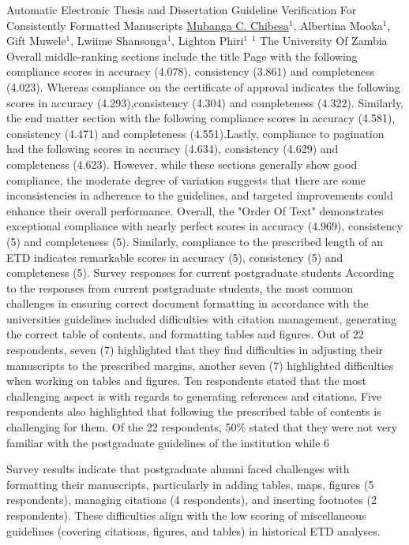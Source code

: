 \begin{abstract_online}{Automatic Electronic Thesis and Dissertation Guideline Verification For Consistently Formatted Manuscripts}{%
    \underline{Mubanga C. Chibesa}$^{1}$, Albertina Mooka$^{1}$, Gift Muwele$^{1}$, Lwiime Shansonga$^{1}$, Lighton Phiri$^{1}$}{%
    }{%
    $^1$ The University Of Zambia}
Overall middle-ranking sections include the title Page with the following compliance scores in accuracy (4.078), consistency (3.861) and completeness (4.023).  Whereas compliance on the certificate of approval indicates the following scores in accuracy (4.293),consistency (4.304) and completeness (4.322). Similarly, the end matter section with the following compliance scores in accuracy (4.581), consistency (4.471) and completeness (4.551).Lastly, compliance to pagination had the following scores in accuracy (4.634), consistency (4.629) and completeness (4.623). 
However, while these sections generally show good compliance, the moderate degree of variation suggests that there are some inconsistencies in adherence to the guidelines, and targeted improvements could enhance their overall performance.
Overall, the "Order Of Text" demonstrates exceptional compliance with nearly perfect scores in accuracy (4.969), consistency (5) and completeness (5). Similarly, compliance to the prescribed length of an ETD indicates remarkable scores in accuracy (5), consistency (5) and completeness (5).
Survey responses for current postgraduate students
According to the responses from current postgraduate students, the most common challenges in ensuring correct document formatting in accordance with the universities guidelines included difficulties with citation management, generating the correct table of contents, and formatting tables and figures. Out of 22 respondents, seven (7) highlighted that they find difficulties in adjusting their manuscripts to  the prescribed margins, another seven (7) highlighted difficulties when working on tables and figures. Ten respondents stated that the most challenging aspect is with regards to generating references and citations. Five respondents also highlighted that following the prescribed table of contents is challenging for them.
Of the 22 respondents, 50\% stated that they were not very familiar with the postgraduate guidelines of the institution while 6 %

Survey results indicate that postgraduate alumni faced challenges with formatting their manuscripts, particularly in adding tables, maps, figures (5 respondents), managing citations (4 respondents), and inserting footnotes (2 respondents). These difficulties align with the low scoring of miscellaneous guidelines (covering citations, figures, and tables) in historical ETD analyses.


\end{abstract_online}
